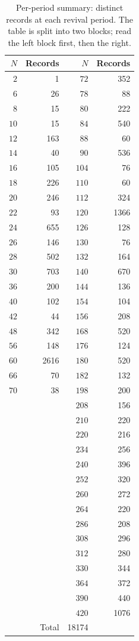 \begin{table}[htbp]
\centering
\caption{Per-period summary: distinct records at each revival period.
The table is split into two blocks; read the left block first, then
the right.}
\label{tab:period-summary}
\begin{tabular}{rr|rr}
\toprule
$N$ & Records & $N$ & Records \\
\midrule
$2$   & 1    & $72$  & 352  \\
$6$   & 26   & $78$  & 88   \\
$8$   & 15   & $80$  & 222  \\
$10$  & 15   & $84$  & 540  \\
$12$  & 163  & $88$  & 60   \\
$14$  & 40   & $90$  & 536  \\
$16$  & 105  & $104$ & 76   \\
$18$  & 226  & $110$ & 60   \\
$20$  & 246  & $112$ & 324  \\
$22$  & 93   & $120$ & 1366 \\
$24$  & 655  & $126$ & 128  \\
$26$  & 146  & $130$ & 76   \\
$28$  & 502  & $132$ & 164  \\
$30$  & 703  & $140$ & 670  \\
$36$  & 200  & $144$ & 136  \\
$40$  & 102  & $154$ & 104  \\
$42$  & 44   & $156$ & 208  \\
$48$  & 342  & $168$ & 520  \\
$56$  & 148  & $176$ & 124  \\
$60$  & 2616 & $180$ & 520  \\
$66$  & 70   & $182$ & 132  \\
$70$  & 38   & $198$ & 200  \\
      &      & $208$ & 156  \\
      &      & $210$ & 220  \\
      &      & $220$ & 216  \\
      &      & $234$ & 256  \\
      &      & $240$ & 396  \\
      &      & $252$ & 320  \\
      &      & $260$ & 272  \\
      &      & $264$ & 220  \\
      &      & $286$ & 208  \\
      &      & $308$ & 296  \\
      &      & $312$ & 280  \\
      &      & $330$ & 344  \\
      &      & $364$ & 372  \\
      &      & $390$ & 440  \\
      &      & $420$ & 1076 \\
\midrule
\multicolumn{2}{r}{Total} & 18174 & \\
\bottomrule
\end{tabular}
\end{table}
